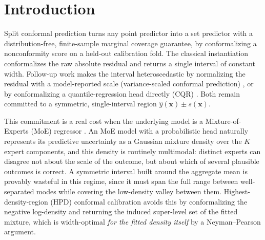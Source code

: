 \documentclass[10pt,twocolumn,a4paper]{article}
\begin{document}
\section{Introduction}
Split conformal prediction \cite{vovk2005algorithmic,lei2018distribution} turns any point predictor
into a set predictor with a distribution-free, finite-sample marginal coverage guarantee, by
conformalizing a nonconformity score on a held-out calibration fold. The classical instantiation
conformalizes the raw absolute residual and returns a single interval of constant width. Follow-up
work makes the interval heteroscedastic by normalizing the residual with a model-reported scale
(variance-scaled conformal prediction) \cite{lei2018distribution}, or by conformalizing a
quantile-regression head directly (CQR) \cite{romano2019conformalized}. Both remain committed to a
symmetric, single-interval region $\hat y(\bm x) \pm s(\bm x)$.

This commitment is a real cost when the underlying model is a Mixture-of-Experts (MoE) regressor
\cite{jordan1994hierarchical}.
An MoE model with a probabilistic head naturally represents its predictive uncertainty as a Gaussian
mixture density over the $K$ expert components, and this density is routinely multimodal: distinct
experts can disagree not about the scale of the outcome, but about which of several plausible
outcomes is correct. A symmetric interval built around the aggregate mean is provably wasteful in
this regime, since it must span the full range between well-separated modes while covering the
low-density valley between them. Highest-density-region (HPD) conformal calibration
\cite{izbicki2020cd,sadinle2019least} avoids this by conformalizing the negative log-density and
returning the induced super-level set of the fitted mixture, which is width-optimal \emph{for the
fitted density itself} by a Neyman--Pearson argument.
\end{document}
